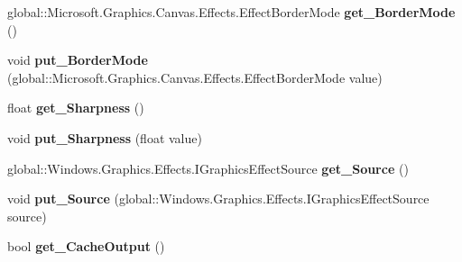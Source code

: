 \begin{DoxyCompactItemize}
\item 
\mbox{\label{class_microsoft_1_1_graphics_1_1_canvas_1_1_effects_1_1_scale_effect_a55f6daa77f8e87c93bb16bad1b42f66f}} 
global\+::\+Microsoft.\+Graphics.\+Canvas.\+Effects.\+Effect\+Border\+Mode {\bfseries get\+\_\+\+Border\+Mode} ()
\item 
\mbox{\label{class_microsoft_1_1_graphics_1_1_canvas_1_1_effects_1_1_scale_effect_a748186f5dde4594a532a983139ef9de8}} 
void {\bfseries put\+\_\+\+Border\+Mode} (global\+::\+Microsoft.\+Graphics.\+Canvas.\+Effects.\+Effect\+Border\+Mode value)
\item 
\mbox{\label{class_microsoft_1_1_graphics_1_1_canvas_1_1_effects_1_1_scale_effect_af9d7328518a161e33d134e8404c3e782}} 
float {\bfseries get\+\_\+\+Sharpness} ()
\item 
\mbox{\label{class_microsoft_1_1_graphics_1_1_canvas_1_1_effects_1_1_scale_effect_a3bcc5dd4772695632d028990483c624d}} 
void {\bfseries put\+\_\+\+Sharpness} (float value)
\item 
\mbox{\label{class_microsoft_1_1_graphics_1_1_canvas_1_1_effects_1_1_scale_effect_af287f17af67dcd8ef6e6aa2531b676f1}} 
global\+::\+Windows.\+Graphics.\+Effects.\+I\+Graphics\+Effect\+Source {\bfseries get\+\_\+\+Source} ()
\item 
\mbox{\label{class_microsoft_1_1_graphics_1_1_canvas_1_1_effects_1_1_scale_effect_a73f7590753a1ddd74e6477cde664e94d}} 
void {\bfseries put\+\_\+\+Source} (global\+::\+Windows.\+Graphics.\+Effects.\+I\+Graphics\+Effect\+Source source)
\item 
\mbox{\label{class_microsoft_1_1_graphics_1_1_canvas_1_1_effects_1_1_scale_effect_a9e3c1a9ee680f9c659f885df60ebf172}} 
bool {\bfseries get\+\_\+\+Cache\+Output} ()
\item 

\end{DoxyCompactItemize}
